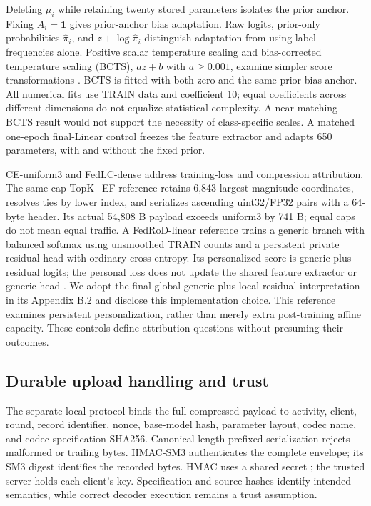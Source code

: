 Deleting $\mu_i$ while retaining twenty stored parameters isolates the prior anchor. Fixing $A_i=\mathbf{1}$ gives prior-anchor bias adaptation. Raw logits, prior-only probabilities $\widehat\pi_i$, and $z+\log\widehat\pi_i$ distinguish adaptation from using label frequencies alone. Positive scalar temperature scaling and bias-corrected temperature scaling (BCTS), $az+b$ with $a\ge0.001$, examine simpler score transformations \cite{guo2017calibration,alexandari2020labelshift}. BCTS is fitted with both zero and the same prior bias anchor. All numerical fits use TRAIN data and coefficient 10; equal coefficients across different dimensions do not equalize statistical complexity. A near-matching BCTS result would not support the necessity of class-specific scales. A matched one-epoch final-Linear control freezes the feature extractor and adapts 650 parameters, with and without the fixed prior.

CE-uniform3 and FedLC-dense address training-loss and compression attribution. The same-cap TopK+EF reference retains 6,843 largest-magnitude coordinates, resolves ties by lower index, and serializes ascending uint32/FP32 pairs with a 64-byte header. Its actual 54,808 B payload exceeds uniform3 by 741 B; equal caps do not mean equal traffic. A FedRoD-linear reference trains a generic branch with balanced softmax using unsmoothed TRAIN counts and a persistent private residual head with ordinary cross-entropy. Its personalized score is generic plus residual logits; the personal loss does not update the shared feature extractor or generic head \cite{chen2022fedrod}. We adopt the final global-generic-plus-local-residual interpretation in its Appendix B.2 and disclose this implementation choice. This reference examines persistent personalization, rather than merely extra post-training affine capacity. These controls define attribution questions without presuming their outcomes.

\subsection{Durable upload handling and trust}

The separate local protocol binds the full compressed payload to activity, client, round, record identifier, nonce, base-model hash, parameter layout, codec name, and codec-specification SHA256. Canonical length-prefixed serialization rejects malformed or trailing bytes. HMAC-SM3 authenticates the complete envelope; its SM3 digest identifies the recorded bytes. HMAC uses a shared secret \cite{rfc2104}; the trusted server holds each client's key. Specification and source hashes identify intended semantics, while correct decoder execution remains a trust assumption.

